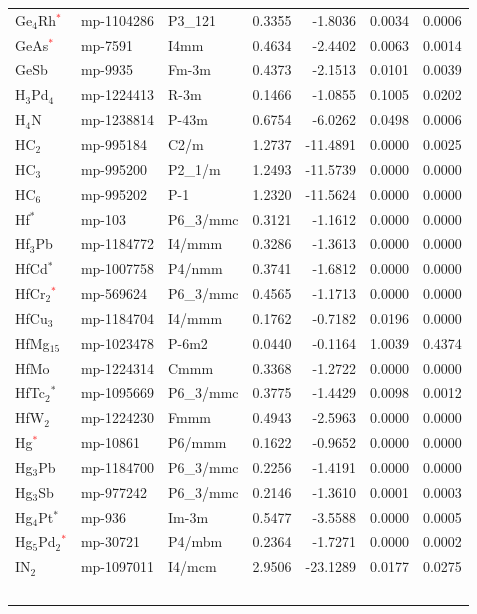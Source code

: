 \begin{longtable}{@{}lllrrrr@{}}
Ge$_{4}$Rh\textcolor{red}{$^*$} & mp-1104286 & P3\_121 & 0.3355 & -1.8036 & 0.0034 & 0.0006 \\
GeAs\textcolor{red}{$^*$} & mp-7591 & I4mm & 0.4634 & -2.4402 & 0.0063 & 0.0014 \\
GeSb & mp-9935 & Fm-3m & 0.4373 & -2.1513 & 0.0101 & 0.0039 \\
H$_{3}$Pd$_{4}$ & mp-1224413 & R-3m & 0.1466 & -1.0855 & 0.1005 & 0.0202 \\
H$_{4}$N & mp-1238814 & P-43m & 0.6754 & -6.0262 & 0.0498 & 0.0006 \\
HC$_{2}$ & mp-995184 & C2/m & 1.2737 & -11.4891 & 0.0000 & 0.0025 \\
HC$_{3}$ & mp-995200 & P2\_1/m & 1.2493 & -11.5739 & 0.0000 & 0.0000 \\
HC$_{6}$ & mp-995202 & P-1 & 1.2320 & -11.5624 & 0.0000 & 0.0000 \\
Hf$^*$ & mp-103 & P6\_3/mmc & 0.3121 & -1.1612 & 0.0000 & 0.0000 \\
Hf$_{3}$Pb & mp-1184772 & I4/mmm & 0.3286 & -1.3613 & 0.0000 & 0.0000 \\
HfCd$^*$ & mp-1007758 & P4/nmm & 0.3741 & -1.6812 & 0.0000 & 0.0000 \\
HfCr$_{2}$\textcolor{red}{$^*$} & mp-569624 & P6\_3/mmc & 0.4565 & -1.1713 & 0.0000 & 0.0000 \\
HfCu$_{3}$ & mp-1184704 & I4/mmm & 0.1762 & -0.7182 & 0.0196 & 0.0000 \\
HfMg$_{15}$ & mp-1023478 & P-6m2 & 0.0440 & -0.1164 & 1.0039 & 0.4374 \\
HfMo & mp-1224314 & Cmmm & 0.3368 & -1.2722 & 0.0000 & 0.0000 \\
HfTc$_{2}$$^*$ & mp-1095669 & P6\_3/mmc & 0.3775 & -1.4429 & 0.0098 & 0.0012 \\
HfW$_{2}$ & mp-1224230 & Fmmm & 0.4943 & -2.5963 & 0.0000 & 0.0000 \\
Hg\textcolor{red}{$^*$} & mp-10861 & P6/mmm & 0.1622 & -0.9652 & 0.0000 & 0.0000 \\
Hg$_{3}$Pb & mp-1184700 & P6\_3/mmc & 0.2256 & -1.4191 & 0.0000 & 0.0000 \\
Hg$_{3}$Sb & mp-977242 & P6\_3/mmc & 0.2146 & -1.3610 & 0.0001 & 0.0003 \\
Hg$_{4}$Pt$^*$ & mp-936 & Im-3m & 0.5477 & -3.5588 & 0.0000 & 0.0005 \\
Hg$_{5}$Pd$_{2}$\textcolor{red}{$^*$} & mp-30721 & P4/mbm & 0.2364 & -1.7271 & 0.0000 & 0.0002 \\
IN$_{2}$ & mp-1097011 & I4/mcm & 2.9506 & -23.1289 & 0.0177 & 0.0275 \\
$$
\end{longtable}
